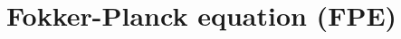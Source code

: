 \documentclass[../main.tex]{subfiles}
\begin{document}
\section{Fokker-Planck equation (FPE)}\label{sec3}


\end{document}
